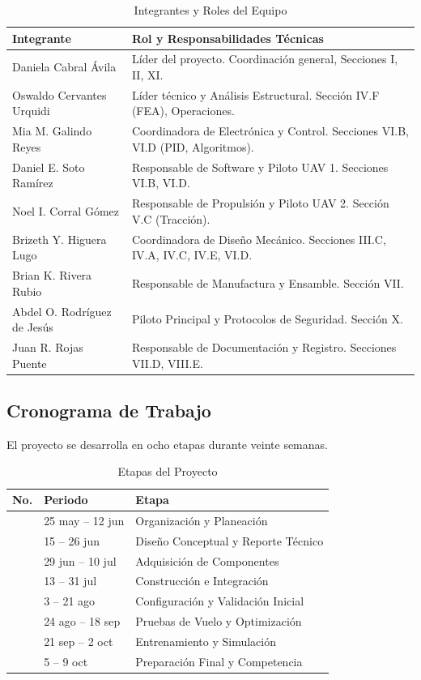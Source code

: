 \documentclass[10pt, twocolumn, letterpaper]{article}
\begin{document}
\begin{table}[H]
\caption{Integrantes y Roles del Equipo}
\fontsize{8}{9}\selectfont
\begin{tabularx}{\columnwidth}{>{\raggedright}p{2.4cm} X}
\toprule
\textbf{Integrante} & \textbf{Rol y Responsabilidades Técnicas} \\
\midrule
Daniela Cabral Ávila & Líder del proyecto. Coordinación general, Secciones I, II, XI. \\
\addlinespace
Oswaldo Cervantes Urquidi & Líder técnico y Análisis Estructural. Sección IV.F (FEA), Operaciones. \\
\addlinespace
Mia M. Galindo Reyes & Coordinadora de Electrónica y Control. Secciones VI.B, VI.D (PID, Algoritmos). \\
\addlinespace
Daniel E. Soto Ramírez & Responsable de Software y Piloto UAV 1. Secciones VI.B, VI.D. \\
\addlinespace
Noel I. Corral Gómez & Responsable de Propulsión y Piloto UAV 2. Sección V.C (Tracción). \\
\addlinespace
Brizeth Y. Higuera Lugo & Coordinadora de Diseño Mecánico. Secciones III.C, IV.A, IV.C, IV.E, VI.D. \\
\addlinespace
Brian K. Rivera Rubio & Responsable de Manufactura y Ensamble. Sección VII. \\
\addlinespace
Abdel O. Rodríguez de Jesús & Piloto Principal y Protocolos de Seguridad. Sección X. \\
\addlinespace
Juan R. Rojas Puente & Responsable de Documentación y Registro. Secciones VII.D, VIII.E. \\
\bottomrule
\end{tabularx}
\end{table}

\subsection{Cronograma de Trabajo}
El proyecto se desarrolla en ocho etapas durante veinte semanas. 

\begin{table}[H]
\caption{Etapas del Proyecto}
\fontsize{8}{9}\selectfont
\begin{tabularx}{\columnwidth}{>{\centering}p{0.5cm} >{\raggedright}p{2.2cm} X}
\toprule
\textbf{No.} & \textbf{Periodo} & \textbf{Etapa} \\
\midrule
1 & 25 may -- 12 jun & Organización y Planeación \\
2 & 15 -- 26 jun & Diseño Conceptual y Reporte Técnico \\
3 & 29 jun -- 10 jul & Adquisición de Componentes \\
4 & 13 -- 31 jul & Construcción e Integración \\
5 & 3 -- 21 ago & Configuración y Validación Inicial \\
6 & 24 ago -- 18 sep & Pruebas de Vuelo y Optimización \\
7 & 21 sep -- 2 oct & Entrenamiento y Simulación \\
8 & 5 -- 9 oct & Preparación Final y Competencia \\
\bottomrule
\end{tabularx}
\end{table}
\end{document}

